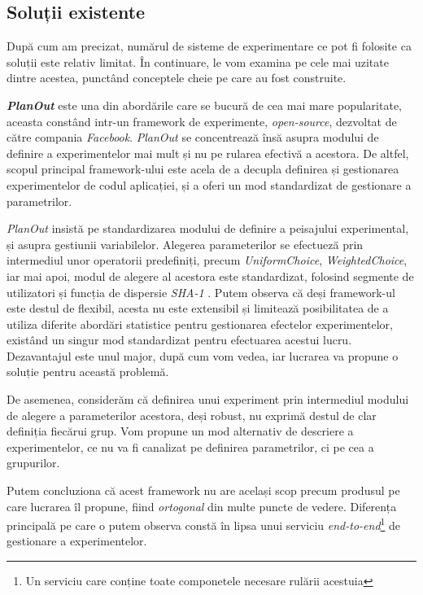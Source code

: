 \subsection{Soluții existente}

După cum am precizat, numărul de sisteme de experimentare ce pot fi folosite ca soluții este relativ limitat. În continuare, le vom examina pe cele mai uzitate dintre acestea, punctând conceptele cheie pe care au fost construite.

\textit{\textbf{PlanOut}} este una din abordările care se bucură de cea mai mare popularitate, aceasta constând intr-un framework de experimente, \textit{open-source}, dezvoltat de către compania \textit{Facebook}. \textit{PlanOut} se concentrează însă asupra modului de definire a experimentelor mai mult și nu pe rularea efectivă a acestora. De altfel, scopul principal framework-ului este acela de a decupla definirea și gestionarea experimentelor de codul aplicației, și a oferi un mod standardizat de gestionare a parametrilor. 

\textit{PlanOut} insistă pe standardizarea modului de definire a peisajului experimental, și asupra gestiunii variabilelor. Alegerea parameterilor se efectueză prin intermediul unor operatorii predefiniți, precum \textit{UniformChoice}, \textit{WeightedChoice}, iar mai apoi, modul de alegere al acestora este standardizat, folosind segmente de utilizatori și funcția de dispersie \textit{SHA-1}  \cite{planout}. Putem observa că deși framework-ul este destul de flexibil, acesta nu este extensibil și limitează posibilitatea de a utiliza diferite abordări statistice pentru gestionarea efectelor experimentelor, existând un singur mod standardizat pentru efectuarea acestui lucru. Dezavantajul este unul major, după cum vom vedea, iar lucrarea va propune o soluție pentru această problemă. 

De asemenea, considerăm că definirea unui experiment prin intermediul modului de alegere a parameterilor acestora, deși robust, nu exprimă destul de clar definiția fiecărui grup. Vom propune un mod alternativ de descriere a experimentelor, ce nu va fi canalizat pe definirea parametrilor, ci pe cea a grupurilor. 

Putem concluziona că acest framework nu are același scop precum produsul pe care lucrarea îl propune, fiind \textit{ortogonal} din multe puncte de vedere. Diferența principală pe care o putem observa constă în lipsa unui serviciu \textit{end-to-end}\footnote{Un serviciu care conține toate componetele necesare rulării acestuia} de gestionare a experimentelor.

